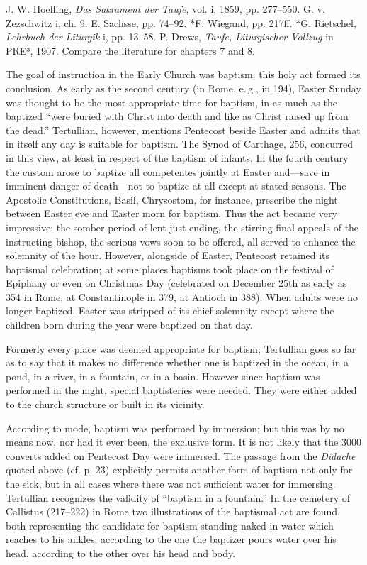 J. W. Hoefling, \emph{Das Sakrament der Taufe}, vol. i, 1859, pp. 277–550. G. v. Zezschwitz i, ch. 9. E. Sachsse, pp. 74–92. *F. Wiegand, pp. 217ff. *G. Rietschel, \emph{Lehrbuch der Liturgik} i, pp. 13–58. P. Drews, \emph{Taufe, Liturgischer Vollzug} in PRE³, 1907. Compare the literature for chapters 7 and 8.

The goal of instruction in the Early Church was baptism; this holy act formed its conclusion. As early as the second century (in Rome, e.\,g., in 194), Easter Sunday was thought to be the most appropriate time for baptism, in as much as the baptized “were buried with Christ into death and like as Christ raised up from the dead.” Tertullian, however, mentions Pentecost beside Easter and admits that in itself any day is suitable for baptism. The Synod of Carthage, 256, concurred in this view, at least in respect of the baptism of infants. In the fourth century the custom arose to baptize all competentes jointly at Easter and—save in imminent danger of death—not to baptize at all except at stated seasons. The Apostolic Constitutions, Basil, Chrysostom, for instance, prescribe the night between Easter eve and Easter morn for baptism. Thus the act became very impressive: the somber period of lent just ending, the stirring final appeals of the instructing bishop, the serious vows soon to be offered, all served to enhance the solemnity of the hour. However, alongside of Easter, Pentecost retained its baptismal celebration; at some places baptisms took place on the festival of Epiphany or even on Christmas Day (celebrated on December 25th as early as 354 in Rome, at Constantinople in 379, at Antioch in 388). When adults were no longer baptized, Easter was stripped of its chief solemnity
except where the children born during the year were baptized on that day.

Formerly every place was deemed appropriate for baptism; Tertullian goes so far as to say that it makes no difference whether one is baptized in the ocean, in a pond, in a river, in a fountain, or in a basin. However since baptism was performed in the night, special baptisteries were needed. They were either added to the church structure or built in its vicinity.

According to mode, baptism was performed by immersion; but this was by no means now, nor had it ever been, the exclusive form. It is not likely that the 3000 converts added on Pentecost Day were immersed. The passage from the \emph{Didache} quoted above (cf. p. 23) explicitly permits another form of baptism not only for the sick, but in all cases where there was not sufficient water for immersing. Tertullian recognizes the validity of “baptism in a fountain.” In the cemetery of Callistus (217–222) in Rome two illustrations of the baptismal act are found, both representing the candidate for baptism standing naked in water which reaches to his ankles; according to the one the baptizer pours water over his head, according to the other over his head and body.

